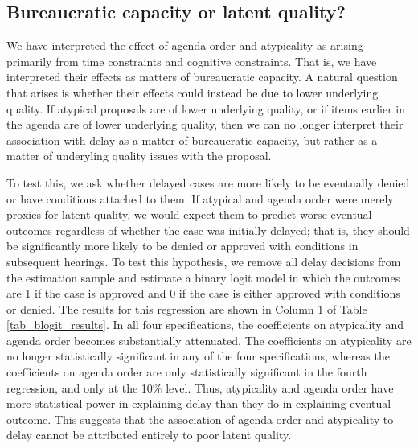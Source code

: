 \subsection{Bureaucratic capacity or latent quality?} \label{sec_latent_quality}

We have interpreted the effect of agenda order and atypicality as arising primarily from time constraints and cognitive constraints. That is, we have interpreted their effects as matters of bureaucratic capacity. A natural question that arises is whether their effects could instead be due to lower underlying quality.  If atypical proposals are of lower underlying quality, or if items earlier in the agenda are of lower underlying quality, then we can no longer interpret their association with delay as a matter of bureaucratic capacity, but rather as a matter of underyling quality issues with the proposal.

To test this, we ask whether delayed cases are more likely to be eventually denied or have conditions attached to them. If atypical and agenda order were merely proxies for latent quality, we would expect them to predict worse eventual outcomes regardless of whether the case was initially delayed; that is, they should be significantly more likely to be denied or approved with conditions in subsequent hearings. To test this hypothesis, we remove all delay decisions from the estimation sample and estimate a binary logit model in which the outcomes are 1 if the case is approved and 0 if the case is either approved with conditions or denied. The results for this regression are shown in Column 1 of Table \ref{tab_blogit_results}. In all four specifications, the coefficients on atypicality and agenda order becomes substantially attenuated. The coefficients on atypicality are no longer statistically significant in any of the four specifications, whereas the coefficients on agenda order are only statistically significant in the fourth regression, and only at the 10\% level. Thus, atypicality and agenda order have more statistical power in explaining delay than they do in explaining eventual outcome. This suggests that the association of agenda order and atypicality to delay cannot be attributed entirely to poor latent quality.

